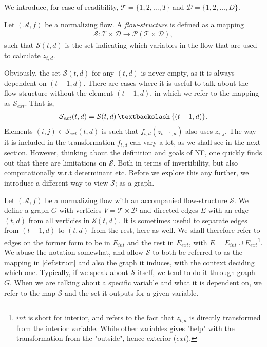 We introduce, for ease of readibility, \(\mathcal{T} = \{1,2,\dots,T\}\) and
\(\mathcal{D} = \{1,2,\dots, D\}\).
\begin{definition}\label{def:struct}
    Let \((\mathcal{A}, f)\) be a normalizing flow.
    A \emph{flow-structure} is defined as a mapping 
   \begin{align*}
       \mathcal{S}\colon \mathcal{T} \times \mathcal{D} \rightarrow 
       \mathcal{P}(\mathcal{T} \times \mathcal{D}),
    \end{align*}
    such that \(\mathcal{S}(t,d)\) is the set indicating 
    which variables in the flow that are used to calculate \(z_{t,d}\).
\end{definition}
\begin{remark}
    Obviously, the set \(\mathcal{S}(t,d)\) for any \((t,d)\) is never 
    empty, as it is always dependent on \((t-1,d)\). There are cases where it is 
    useful to talk about the flow-structure without the element \((t-1,d)\), in
    which we refer to the mapping as \(\mathcal{S}_{ext}\). That is,
    \begin{align*}
        \mathcal{S}_{ext}(t,d) = \mathcal{S}(t,d)\,\textbackslash\, \{(t-1,d)\}.
    \end{align*}
    Elements \((i,j) \in \mathcal{S}_{ext}(t,d)\) is such that \(f_{t,d}(z_{t-1,d})\) also
    uses \(z_{i,j}\). The way it is included in the transformation \(f_{t,d}\)
    can vary a lot, as we shall see in the next section. However, thinking about
    the definition and goals of NF, one quickly finds out that there are limitations
    on \(\mathcal{S}\). Both in terms of invertibility, but also computationally w.r.t
    determinant etc. Before we explore this any further, we introduce a different 
    way to view \(\mathcal{S}\); as a graph.
\end{remark}
Let \((\mathcal{A}, f)\) be a normalizing flow with an accompanied flow-structure
\(\mathcal{S}\). We define a graph \(G\) with verticies \(V = \mathcal{T} \times \mathcal{D}\)
and directed edges \(E\) with an edge \((t,d)\) from all verticies in \(\mathcal{S}(t,d)\). It is
sometimes useful to separate edges from \((t-1,d)\) to \((t,d)\) from the rest, here as well. We shall therefore
refer to edges on the former form to be in \(E_{int}\) and the rest in \(E_{ext}\), with 
\(E = E_{int} \cup E_{ext}\)\footnote{\(int\) is short for interior, and refers to the fact 
that \(z_{t,d}\) is directly transformed from the interior variable. While other
variables gives "help" with the transformation from the "outside", hence exterior (\(ext\)).}. We abuse
the notation somewhat, and allow \(\mathcal{S}\) to both be referred to as the mapping in \cref{def:struct} and
also the graph it induces, with the context deciding which one. Typically, if we speak about \(\mathcal{S}\)
itself, we tend to do it through graph \(G\). When we are talking about a specific variable and what it is 
dependent on, we refer to the map \(\mathcal{S}\) and the set it outputs for a given variable. 
